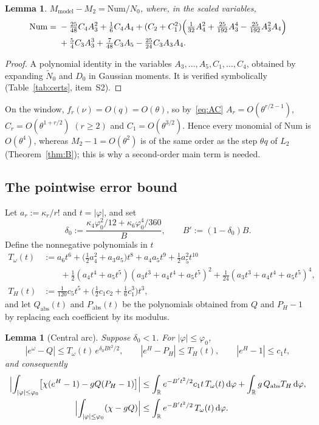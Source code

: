 \documentclass[11pt]{amsart}
\newtheorem{lemma}[theorem]{Lemma}
\theoremstyle{definition}
\theoremstyle{remark}
\numberwithin{equation}{section}
\newcommand{\RR}{\mathbb{R}}
\newcommand{\dd}{\,\mathrm{d}}
\begin{document}
\begin{lemma}\label{lem:gap}
$M_{\mathrm{model}}-M_2=\mathrm{Num}/N_0$, where, in the scaled variables,
\[
\begin{aligned}
\mathrm{Num}={}&-\tfrac{25}{48}C_4A_3^2+\tfrac16C_4A_4+(C_2+C_1^2)\Bigl(\tfrac{1}{32}A_4^2+\tfrac{25}{192}A_3^4-\tfrac{25}{192}A_3^2A_4\Bigr)\\
&+\tfrac54C_3A_3^3+\tfrac{7}{48}C_3A_5-\tfrac{25}{24}C_3A_3A_4 .
\end{aligned}
\]
\end{lemma}

\begin{proof}
A polynomial identity in the variables $A_3,\dots,A_5,C_1,\dots,C_4$, obtained by expanding $\tilde N_0$ and $D_0$ in Gaussian
moments. It is verified symbolically (Table~\ref{tab:certs}, item~S2).
\end{proof}

On the window, $f_r(\nu)=O(q)=O(\theta)$, so by~\eqref{eq:AC} $A_r=O(\theta^{r/2-1})$, $C_r=O(\theta^{1+r/2})$ $(r\ge2)$ and
$C_1=O(\theta^{3/2})$. Hence every monomial of $\mathrm{Num}$ is $O(\theta^4)$, whereas $M_2-1=O(\theta^2)$ is of the same order as the
step $\theta q$ of $L_2$ (Theorem~\ref{thm:B}); this is why a second-order main term is needed.

\subsection{The pointwise error bound}
Let $a_r:=\kappa_r/r!$ and $t=|\varphi|$, and set
\[
  \delta_0:=\frac{\kappa_4\varphi_0^2/12+\kappa_6\varphi_0^4/360}{B},\qquad B':=(1-\delta_0)B .
\]
Define the nonnegative polynomials in $t$
\[
\begin{aligned}
T_\omega(t)&:=a_6t^6+\bigl(\tfrac12a_4^2+a_3a_5\bigr)t^8+a_4a_5t^9+\tfrac12a_5^2t^{10}\\
  &\qquad+\tfrac12(a_4t^4+a_5t^5)(a_3t^3+a_4t^4+a_5t^5)^2+\tfrac1{24}(a_3t^3+a_4t^4+a_5t^5)^4,\\
T_H(t)&:=\tfrac{1}{120}c_5t^5+\bigl(\tfrac12c_1c_2+\tfrac16c_1^3\bigr)t^3,
\end{aligned}
\]
and let $Q_{\mathrm{abs}}(t)$ and $P_{\mathrm{abs}}(t)$ be the polynomials obtained from $Q$ and $P_H-1$ by replacing each coefficient by
its modulus.

\begin{lemma}[Central arc]\label{lem:central}
Suppose $\delta_0<1$. For $|\varphi|\le\varphi_0$,
\[
  |e^{\omega}-Q|\le T_\omega(t)\,e^{\delta_0Bt^2/2},\qquad |e^H-P_H|\le T_H(t),\qquad |e^H-1|\le c_1t,
\]
and consequently
\[
\begin{aligned}
  \Bigl|\int_{|\varphi|\le\varphi_0}\bigl[\chi(e^H-1)-gQ(P_H-1)\bigr]\Bigr|&\le\int_\RR e^{-B't^2/2}c_1t\,T_\omega(t)\dd\varphi+\int_\RR g\,Q_{\mathrm{abs}}T_H\dd\varphi,\\
  \Bigl|\int_{|\varphi|\le\varphi_0}(\chi-gQ)\Bigr|&\le\int_\RR e^{-B't^2/2}\,T_\omega(t)\dd\varphi .
\end{aligned}
\]
\end{lemma}
\end{document}
